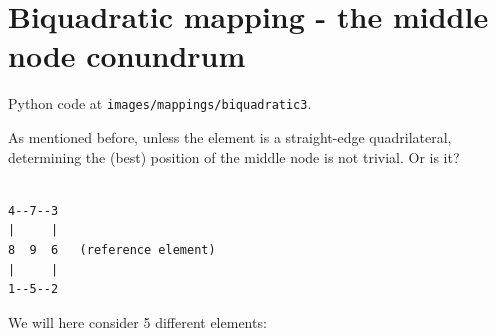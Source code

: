 \section{Biquadratic mapping - the middle node conundrum}

Python code at {\tt images/mappings/biquadratic3}.

As mentioned before, unless the element is a straight-edge quadrilateral, 
determining the (best) position of the middle node is not trivial. Or is it?


\begin{verbatim}

4--7--3
|     |
8  9  6   (reference element)
|     |
1--5--2

\end{verbatim}

We will here consider 5 different elements:

